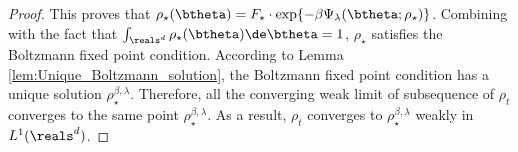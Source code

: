 \documentclass[11pt]{article}
\renewcommand{\eqref}[1]{(\ref{#1})}
\begin{document}
\begin{proof}
This proves that $\rho_\star(\btheta) = F_\star \cdot \exp\{ - \beta \Psi_\lambda(\btheta; \rho_\star) \}$. Combining with the fact that $\int_{\reals^d} \rho_\star(\btheta) \de \btheta = 1$, $\rho_\star$ satisfies the Boltzmann fixed point condition. According to Lemma \ref{lem:Unique_Boltzmann_solution}, the Boltzmann fixed point condition has a unique solution $\rho_\star^{\beta, \lambda}$. Therefore, all the converging weak limit of subsequence of $\rho_t$ converges to the same point $\rho_\star^{\beta, \lambda}$. As a result, $\rho_t$ converges to $\rho_\star^{\beta, \lambda}$ weakly in $L^1(\reals^d)$. 

\end{proof}

%
%
%
%
%
%
\end{document}
